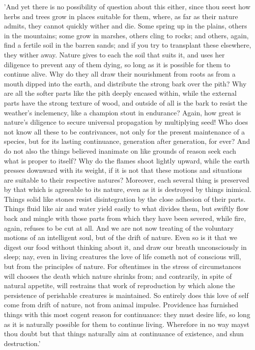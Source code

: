 'And yet there is no possibility of question about this either, since
thou seest how herbs and trees grow in places suitable for them, where,
as far as their nature admits, they cannot quickly wither and die. Some
spring up in the plains, others in the mountains; some grow in marshes,
others cling to rocks; and others, again, find a fertile soil in the
barren sands; and if you try to transplant these elsewhere, they wither
away. Nature gives to each the soil that suits it, and uses her
diligence to prevent any of them dying, so long as it is possible for
them to continue alive. Why do they all draw their nourishment from
roots as from a mouth dipped into the earth, and distribute the strong
bark over the pith? Why are all the softer parts like the pith deeply
encased within, while the external parts have the strong texture of
wood, and outside of all is the bark to resist the weather's
inclemency, like a champion stout in endurance? Again, how great is
nature's diligence to secure universal propagation by multiplying seed!
Who does not know all these to be contrivances, not only for the present
maintenance of a species, but for its lasting continuance, generation
after generation, for ever? And do not also the things believed
inanimate on like grounds of reason seek each what is proper to itself?
Why do the flames shoot lightly upward, while the earth presses downward
with its weight, if it is not that these motions and situations are
suitable to their respective natures? Moreover, each several thing is
preserved by that which is agreeable to its nature, even as it is
destroyed by things inimical. Things solid like stones resist
disintegration by the close adhesion of their parts. Things fluid like
air and water yield easily to what divides them, but swiftly flow back
and mingle with those parts from which they have been severed, while
fire, again, refuses to be cut at all. And we are not now treating of
the voluntary motions of an intelligent soul, but of the drift of
nature. Even so is it that we digest our food without thinking about it,
and draw our breath unconsciously in sleep; nay, even in living
creatures the love of life cometh not of conscious will, but from the
principles of nature. For oftentimes in the stress of circumstances will
chooses the death which nature shrinks from; and contrarily, in spite of
natural appetite, will restrains that work of reproduction by which
alone the persistence of perishable creatures is maintained. So entirely
does this love of self come from drift of nature, not from animal
impulse. Providence has furnished things with this most cogent reason
for continuance: they must desire life, so long as it is naturally
possible for them to continue living. Wherefore in no way mayst thou
doubt but that things naturally aim at continuance of existence, and
shun destruction.'

